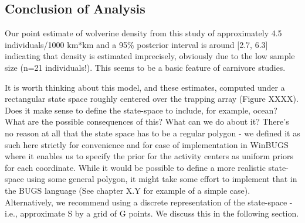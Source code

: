 \subsection{Conclusion of Analysis}

Our point estimate of wolverine density from this study of approximately 4.5 individuals/1000 km*km and a 95\% posterior interval is around [2.7, 6.3] indicating that density is estimated imprecisely, obviously due to the low sample size (n=21 individuals!). This seems to be a basic feature of carnivore studies. 

It is worth thinking about this model, and these estimates, computed under a rectangular state space roughly centered over the trapping array (Figure XXXX). Does it make sense to define the state-space to include, for example, ocean? What are the possible consequences of this? What can we do about it?  There's no reason at all that the state space has to be a regular polygon - we defined it as such here strictly for convenience and for ease of implementation in WinBUGS where it enables us to specify the prior for the activity centers as uniform priors for each coordinate.  While it would be possible to define a more realistic state-space using some general polygon, it might take some effort to implement that in the BUGS language (See chapter X.Y for example of a simple case). Alternatively, we recommend using a discrete representation of the state-space - i.e., approximate {\cal S} by a grid of G points. We discuss this in the following section.

